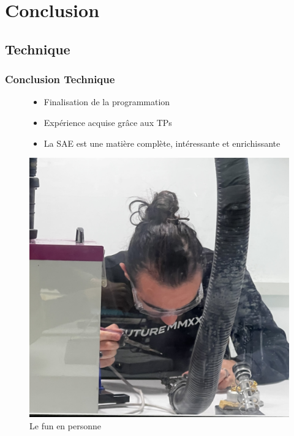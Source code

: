 \section{Conclusion}

\subsection{Technique}
\begin{frame}
    \frametitle{Conclusion Technique}

    \begin{figure}[H]
        \centering
        \begin{minipage}{.5\textwidth}
            \centering
            \begin{itemize}
                \item Finalisation de la programmation
                \item Expérience acquise grâce aux TPs
                \item La SAE est une matière complète, intéressante et enrichissante
            \end{itemize} 
        \end{minipage}%
        \begin{minipage}{.5\textwidth}
            \centering
            \includegraphics[width=.7\linewidth]{Images/fun.png}
            \caption{Le fun en personne}
            \label{fig:fun}
        \end{minipage}%
    \end{figure}
    
\footer{\hfill\insertframenumber/\inserttotalframenumber}
\end{frame}

